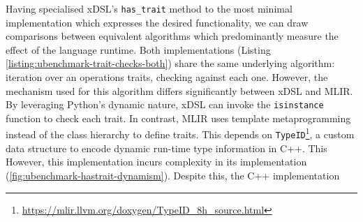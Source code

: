 Having specialised xDSL's \texttt{has_trait} method to the most minimal implementation which expresses the desired functionality, we can draw comparisons between equivalent algorithms which predominantly measure the effect of the language runtime.
Both implementations (Listing \ref{listing:ubenchmark-trait-checks-both}) share the same underlying algorithm: iteration over an operations traits, checking against each one. However, the mechanism used for this algorithm differs significantly between xDSL and MLIR.
By leveraging Python's dynamic nature, xDSL can invoke the \texttt{isinstance} function to check each trait. In contrast, MLIR uses template metaprogramming instead of the class hierarchy to define traits. This depends on \texttt{TypeID}\footnote{\url{https://mlir.llvm.org/doxygen/TypeID_8h_source.html}}, a custom data structure to encode dynamic run-time type information in C++.
This
However, this implementation incurs complexity in its implementation (\autoref{fig:ubenchmark-hastrait-dynamism}). Despite this, the C++ implementation 


